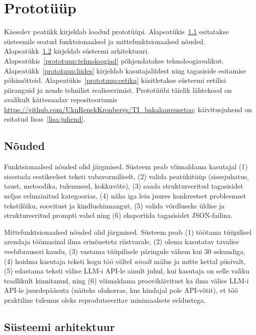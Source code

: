 \section{Prototüüp} \label{prototuup}

Käesolev peatükk kirjeldab loodud prototüüpi. Alapeatükis~\ref{prototuup:nouded} esitatakse süsteemile seatud funktsionaalsed ja mittefunktsionaalsed nõuded. Alapeatükk~\ref{prototuup:arhitektuur} kirjeldab süsteemi arhitektuuri. Alapeatükis~\ref{prototuup:tehnoloogiad} põhjendatakse tehnoloogiavalikut. Alapeatükk~\ref{prototuup:liides} kirjeldab kasutajaliidest ning tagasiside esitamise põhimõtteid. Alapeatükis~\ref{prototuup:eetika} käsitletakse süsteemi eetilisi piiranguid ja nende tehnilist realiseerimist. Prototüübi täielik lähtekood on avalikult kättesaadav repositooriumis \url{https://github.com/UkuRenekKronbergs/TI_bakalaureusetoo}; käivitusjuhend on esitatud lisas~\ref{lisa:juhend}.

\subsection{Nõuded} \label{prototuup:nouded}

Funktsionaalsed nõuded olid järgmised. Süsteem peab võimaldama kasutajal (1) sisestada eestikeelset teksti vabavormiliselt, (2) valida peatükitüüp (sissejuhatus, taust, metoodika, tulemused, kokkuvõte), (3) saada struktureeritud tagasisidet neljas eelmainitud kategoorias, (4) näha iga leiu juures konkreetset probleemset tekstilõiku, soovitust ja kindlushinnangut, (5) valida võrdluseks üldise ja struktureeritud prompti vahel ning (6) eksportida tagasisidet JSON-failina.

Mittefunktsionaalsed nõuded olid järgmised. Süsteem peab (1) töötama tüüpilisel arendaja töömasinal ilma erinõueteta riistvarale, (2) olema kasutatav tavalise veebibrauseri kaudu, (3) vastama tüüpilisele päringule vähem kui 30 sekundiga, (4) hoidma kasutaja teksti kogu töö vältel \emph{ainult} mälus ja mitte kettal püsivalt, (5) edastama teksti välise LLM-i API-le ainult juhul, kui kasutaja on selle valiku teadlikult kinnitanud, ning (6) võimaldama proovikäivitust ka ilma välise LLM-i API-le juurdepääsuta (näiteks olukorras, kus hindajal pole API-võtit), et töö praktiline tulemus oleks reprodutseeritav minimaalsete eeldustega.

\subsection{Süsteemi arhitektuur} \label{prototuup:arhitektuur}

